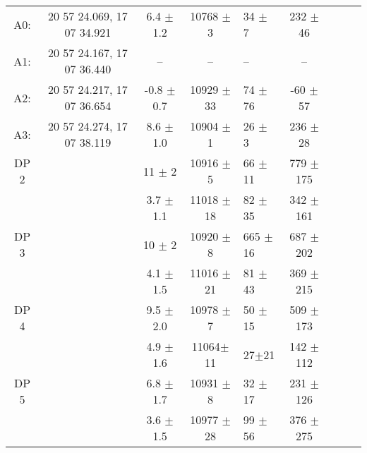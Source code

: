 \documentclass[]{aa} %
\begin{document}
\begin{table*}
\begin{center}
\begin{tabular}{c c c c l c c c c}
   A0:      & 20 57 24.069, 17 07 34.921  & 6.4  $\pm$ 1.2    & 10768 $\pm$ 3     & 34 $\pm$ 7    & 232 $\pm$ 46    \\
   A1:      & 20 57 24.167, 17 07 36.440  & --                 & --                   & --                 & --                  \\
   A2:      & 20 57 24.217, 17 07 36.654  & -0.8 $\pm$ 0.7    & 10929 $\pm$ 33   & 74 $\pm$ 76   & -60 $\pm$ 57    \\
   A3:      & 20 57 24.274, 17 07 38.119  & 8.6  $\pm$ 1.0    & 10904 $\pm$ 1     & 26 $\pm$ 3    & 236 $\pm$ 28    \\
 \hline
   DP 2     &          & 11 $\pm$ 2        & 10916 $\pm$ 5    & 66 $\pm$ 11      & 779 $\pm$ 175    \\   %
             &         & 3.7 $\pm$ 1.1         & 11018 $\pm$ 18   & 82 $\pm$ 35       & 342  $\pm$ 161      \\   %

   DP 3      &         & 10 $\pm$ 2         & 10920 $\pm$ 8    & 665 $\pm$ 16    & 687 $\pm$ 202    \\   %
             &         & 4.1 $\pm$ 1.5         & 11016 $\pm$ 21   & 81 $\pm$ 43     & 369 $\pm$ 215    \\   %

   DP 4      &         & 9.5 $\pm$ 2.0         & 10978 $\pm$ 7    & 50 $\pm$ 15     & 509 $\pm$ 173     \\   %
             &         & 4.9 $\pm$ 1.6         & 11064$\pm$ 11   & 27$\pm$21      & 142 $\pm$ 112    \\   %

   DP 5      &         & 6.8 $\pm$ 1.7         & 10931 $\pm$ 8    & 32 $\pm$ 17      & 231 $\pm$ 126    \\   %
             &         & 3.6 $\pm$ 1.5         & 10977 $\pm$ 28   & 99 $\pm$ 56      & 376 $\pm$ 275     \\   %


\end{tabular}
\end{center}
\end{table*}
\end{document}
